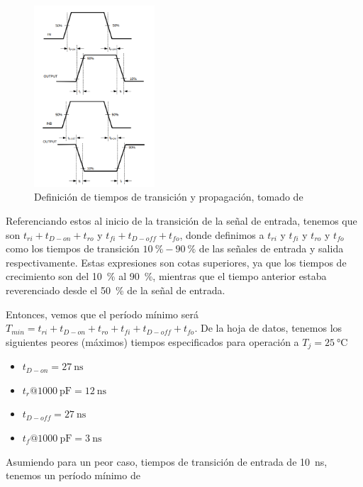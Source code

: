 \begin{figure}[tbp]
    \centering
    \includegraphics[width=0.4\textwidth]{images/lm5114_timing_definitions.png}
    \caption{Definición de tiempos de transición y propagación, tomado de
    \cite{LM5114_datasheet}}
    \label{fig:lm5114_timing_definitions}
\end{figure}

Referenciando estos al inicio de la transición de la señal de entrada, tenemos
que son $t_{ri}+t_{D-on}+t_{ro}$ y $t_{fi}+t_{D-off}+t_{fo}$, donde definimos a
$t_{ri}$ y $t_{fi}$ y $t_{ro}$ y $t_{fo}$ como los tiempos de transición
$\qty{10}{\percent}-\qty{90}{\percent}$ de las señales de entrada y salida
respectivamente. Estas expresiones son cotas superiores, ya que los tiempos de
crecimiento son del \qty{10}{\percent} al \qty{90}{\percent}, mientras que el
tiempo anterior estaba reverenciado desde el \qty{50}{\percent} de la señal de
entrada.

Entonces, vemos que el período mínimo será $T_{min} = t_{ri} + t_{D-on} + t_{ro}
+ t_{fi} + t_{D-off} + t_{fo}$. De la hoja de datos, tenemos los siguientes
peores (máximos) tiempos especificados para operación a $T_j=\qty{25}{\celsius}$

\begin{itemize}
    \item $t_{D-on} = \qty{27}{\nano\second}$
    \item $t_{r} @ \qty{1000}{\pico\farad} = \qty{12}{\nano\second}$
    \item $t_{D-off} = \qty{27}{\nano\second}$
    \item $t_{f} @ \qty{1000}{\pico\farad} = \qty{3}{\nano\second}$
\end{itemize}

Asumiendo para un peor caso, tiempos de transición de entrada de
\qty{10}{\nano\second},  tenemos un período mínimo de

